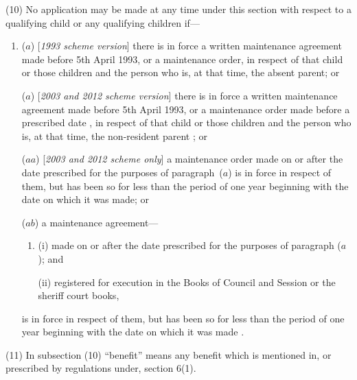 \documentclass[12pt,a4paper]{article}
\begin{document}
(10) No application may be made at any time under this section with respect to a qualifying child or any qualifying children if—
\begin{enumerate}\item[]
($a$) [\emph{1993 scheme version}] there is in force a written maintenance agreement made before 5th April 1993, or a maintenance order, in respect of that child or those children and the person who is, at that time, the absent parent; or

($a$) [\emph{2003 and 2012 scheme version}] there is in force a written maintenance agreement made before 5th April 1993, or a maintenance order
made before a prescribed date%
, in respect of that child or those children and the person who is, at that time, the 
non-resident parent%
; or

($aa$) [\emph{2003 and 2012 scheme only}] a maintenance order made on or after the date prescribed for the purposes of paragraph~($a$)  is in force in respect of them, but has been so for less than the period of one year beginning with the date on which it was made; or

($ab$) a maintenance agreement—
\begin{enumerate}\item[]
(i) made on or after the date prescribed for the purposes of paragraph ($a$); and

(ii) registered for execution in the Books of Council and Session or the sheriff court books,
\end{enumerate}
is in force in respect of them, but has been so for less than the period of one year beginning with the date on which it was made%
%
.
\end{enumerate}

(11) In subsection (10) “benefit” means any benefit which is mentioned in, or prescribed by regulations under, section 6(1).
\end{document}
